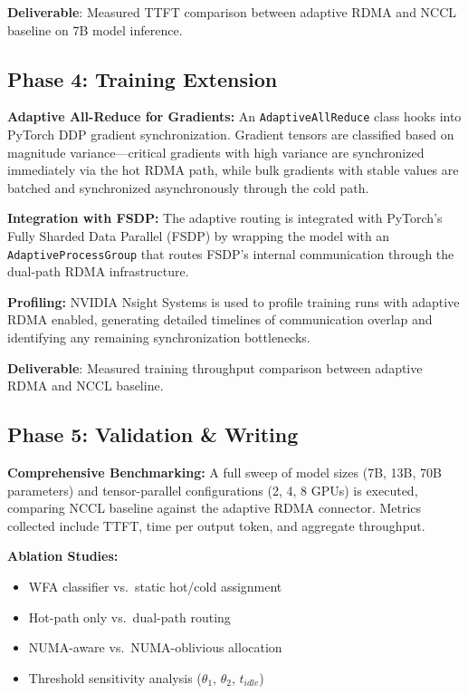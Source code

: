 \documentclass[10pt,letterpaper]{article}
\begin{document}
\textbf{Deliverable}: Measured TTFT comparison between adaptive RDMA and NCCL baseline on 7B model inference.

\subsection{Phase 4: Training Extension}

\textbf{Adaptive All-Reduce for Gradients:} An \texttt{AdaptiveAllReduce} class hooks into PyTorch DDP gradient synchronization. Gradient tensors are classified based on magnitude variance---critical gradients with high variance are synchronized immediately via the hot RDMA path, while bulk gradients with stable values are batched and synchronized asynchronously through the cold path.

\textbf{Integration with FSDP:} The adaptive routing is integrated with PyTorch's Fully Sharded Data Parallel (FSDP) by wrapping the model with an \texttt{AdaptiveProcessGroup} that routes FSDP's internal communication through the dual-path RDMA infrastructure.

\textbf{Profiling:} NVIDIA Nsight Systems is used to profile training runs with adaptive RDMA enabled, generating detailed timelines of communication overlap and identifying any remaining synchronization bottlenecks.

\textbf{Deliverable}: Measured training throughput comparison between adaptive RDMA and NCCL baseline.

\subsection{Phase 5: Validation \& Writing}

\textbf{Comprehensive Benchmarking:} A full sweep of model sizes (7B, 13B, 70B parameters) and tensor-parallel configurations (2, 4, 8 GPUs) is executed, comparing NCCL baseline against the adaptive RDMA connector. Metrics collected include TTFT, time per output token, and aggregate throughput.

\textbf{Ablation Studies:}
\begin{itemize}[noitemsep]
    \item WFA classifier vs.\ static hot/cold assignment
    \item Hot-path only vs.\ dual-path routing
    \item NUMA-aware vs.\ NUMA-oblivious allocation
    \item Threshold sensitivity analysis ($\theta_1$, $\theta_2$, $t_{idle}$)
\end{itemize}
\end{document}
